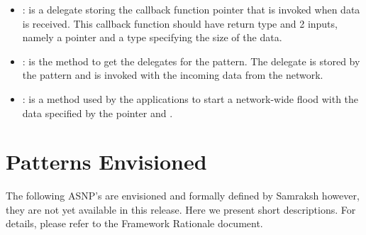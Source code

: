 \begin{itemize}

	\item {} : is a delegate storing the callback function pointer that is invoked when data is received. This callback function should have   return type and 2 inputs, namely a  pointer and a   type specifying the size of the data.
	
	\item {} : 
	is the method to get the delegates for the  pattern. The delegate is stored by the pattern and is invoked with the incoming data from the network. 
	
	\item {} : is a method used by the applications to start a network-wide flood with the data specified by the pointer  and .
	
	

\end{itemize}

%

\section{Patterns Envisioned}

The following ASNP's are envisioned and formally defined by Samraksh however, they are not yet available in this release. Here we present short descriptions. For details, please refer to the Framework Rationale document. 


